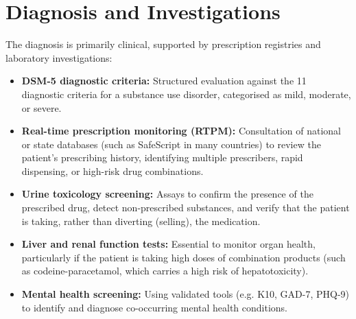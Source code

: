 \section*{Diagnosis and Investigations}
The diagnosis is primarily clinical, supported by prescription registries and laboratory investigations:
\begin{itemize}
    \item \textbf{DSM-5 diagnostic criteria:} Structured evaluation against the 11 diagnostic criteria for a substance use disorder, categorised as mild, moderate, or severe.
    \item \textbf{Real-time prescription monitoring (RTPM):} Consultation of national or state databases (such as SafeScript in many countries) to review the patient's prescribing history, identifying multiple prescribers, rapid dispensing, or high-risk drug combinations.
    \item \textbf{Urine toxicology screening:} Assays to confirm the presence of the prescribed drug, detect non-prescribed substances, and verify that the patient is taking, rather than diverting (selling), the medication.
    \item \textbf{Liver and renal function tests:} Essential to monitor organ health, particularly if the patient is taking high doses of combination products (such as codeine-paracetamol, which carries a high risk of hepatotoxicity).
    \item \textbf{Mental health screening:} Using validated tools (e.g. K10, GAD-7, PHQ-9) to identify and diagnose co-occurring mental health conditions.
\end{itemize}

